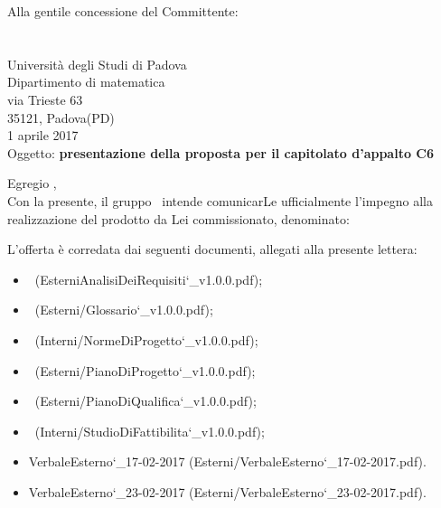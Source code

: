 \documentclass[a4paper,12pt]{article}
\author{KaleidosCode}
\date{1/4/2017}	%
\begin{document}
 	\begin{titlepage}
 		\centering
 		\logo
 		\vspace{1.2cm}
 		\flushright Alla gentile concessione del Committente: \\
 		\vardanega \\
 		\cardin\\
 		Università degli Studi di Padova \\
 		Dipartimento di matematica\\
 		via Trieste 63\\
 		35121, Padova(PD)\\
 		\vspace{0.5cm}
 		1 aprile 2017\\
 		\vspace{1.4cm}
 		\flushleft
 		Oggetto: \textbf{presentazione della proposta per il capitolato d’appalto C6}
 		\vspace{0.4cm}
		\flushleft	\responsabilediprogetto\\
		\kaleidoscode
		
		\vspace{0.6cm}
		Egregio \vardanega ,\\
		\vspace{0.4cm}
		Con la presente, il gruppo \kaleidoscode\ intende comunicarLe ufficialmente l’impegno alla realizzazione del prodotto da Lei commissionato, denominato:
		
		
		L’offerta è corredata dai seguenti documenti, allegati alla presente lettera:
		\begin{itemize}
			\item \analisideirequisitiv\  (EsterniAnalisiDeiRequisiti\char`_v1.0.0.pdf);
			\item \glossariov\  (Esterni/Glossario\char`_v1.0.0.pdf);
			\item \normediprogettov\  (Interni/NormeDiProgetto\char`_v1.0.0.pdf);
			\item \pianodiprogettov\  (Esterni/PianoDiProgetto\char`_v1.0.0.pdf);
			\item \pianodiqualificav\  (Esterni/PianoDiQualifica\char`_v1.0.0.pdf);
			\item \studiodifattibilitav\  (Interni/StudioDiFattibilita\char`_v1.0.0.pdf);
			\item VerbaleEsterno\char`_17-02-2017 (Esterni/VerbaleEsterno\char`_17-02-2017.pdf).
			\item VerbaleEsterno\char`_23-02-2017  (Esterni/VerbaleEsterno\char`_23-02-2017.pdf).
\end{itemize}
		

\end{titlepage}
\end{document}
